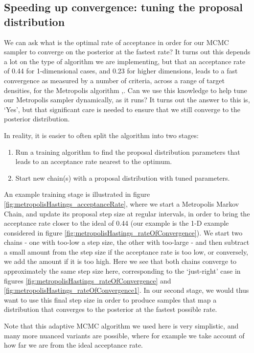 \documentclass[11pt,fullpage]{book}
\begin{document}
\subsection{Speeding up convergence: tuning the proposal distribution}
We can ask what is the optimal rate of acceptance in order for our MCMC sampler to converge on the posterior at the fastest rate? It turns out this depends a lot on the type of algorithm we are implementing, but that an acceptance rate of 0.44 for 1-dimensional cases, and 0.23 for higher dimensions, leads to a fast convergence as measured by a number of criteria, across a range of target densities, for the Metropolis algorithm \cite{roberts1997weak},\cite{rosenthal2011optimal}. Can we use this knowledge to help tune our Metropolis sampler dynamically, as it runs? It turns out the answer to this is, `Yes', but that significant care is needed to ensure that we still converge to the posterior distribution. 

In reality, it is easier to often split the algorithm into two stages:
%
\begin{enumerate}
\item Run a training algorithm to find the proposal distribution parameters that leads to an acceptance rate nearest to the optimum. 
\item Start new chain(s) with a proposal distribution with tuned parameters.
\end{enumerate}
%
An example training stage is illustrated in figure \ref{fig:metropolisHastings_acceptanceRate}, where we start a Metropolis Markov Chain, and update its proposal step size at regular intervals, in order to bring the acceptance rate closer to the ideal of 0.44 (our example is the 1-D example considered in figure \ref{fig:metropolisHastings_rateOfConvergence}). We start two chains - one with too-low a step size, the other with too-large - and then subtract a small amount from the step size if the acceptance rate is too low, or conversely, we add the amount if it is too high. Here we see that both chains converge to approximately the same step size here, corresponding to the `just-right' case in figures \ref{fig:metropolisHastings_rateOfConvergence} and \ref{fig:metropolisHastings_rateOfConvergence1}. In our second stage, we would thus want to use this final step size in order to produce samples that map a distribution that converges to the posterior at the fastest possible rate.

Note that this adaptive MCMC algorithm we used here is very simplistic, and many more nuanced variants are possible, where for example we take account of how far we are from the ideal acceptance rate. 
\end{document}

